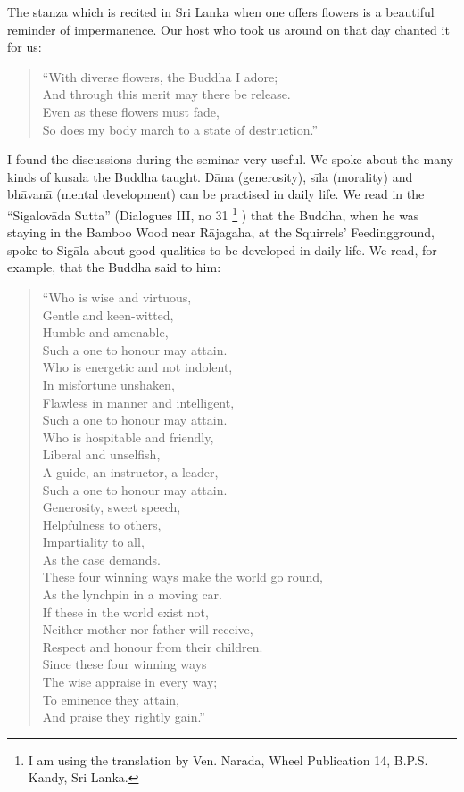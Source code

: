 The stanza which is recited in Sri Lanka when one offers flowers is a
beautiful reminder of impermanence. Our host who took us around on that
day chanted it for us:

\begin{verse}

``With diverse flowers, the Buddha I adore;\\
And through this merit may there be release.\\
Even as these flowers must fade,\\
So does my body march to a state of destruction.''

\end{verse}

I found the discussions during the seminar very useful. We spoke about
the many kinds of kusala the Buddha taught. Dāna (generosity), sīla
(morality) and bhāvanā (mental development) can be practised in daily
life. We read in the ``Sigalovāda Sutta'' (Dialogues III, no 31
\footnote{I am using the translation by Ven.
Narada, Wheel Publication 14, B.P.S. Kandy, Sri Lanka.}
) that the Buddha, when he was staying in the Bamboo Wood near Rājagaha,
at the Squirrels' Feedingground, spoke to Sigāla about good qualities to
be developed in daily life. We read, for example, that the Buddha said
to him:

\begin{verse}

``Who is wise and virtuous,\\
Gentle and keen-witted,\\
Humble and amenable,\\
Such a one to honour may attain.\\
Who is energetic and not indolent,\\
In misfortune unshaken,\\
Flawless in manner and intelligent,\\
Such a one to honour may attain.\\
Who is hospitable and friendly,\\
Liberal and unselfish,\\
A guide, an instructor, a leader,\\
Such a one to honour may attain.\\
Generosity, sweet speech,\\
Helpfulness to others,\\
Impartiality to all,\\
As the case demands.\\
These four winning ways make the world go round,\\
As the lynchpin in a moving car.\\
If these in the world exist not,\\
Neither mother nor father will receive,\\
Respect and honour from their children.\\
Since these four winning ways\\
The wise appraise in every way;\\
To eminence they attain,\\
And praise they rightly gain.''

\end{verse}

